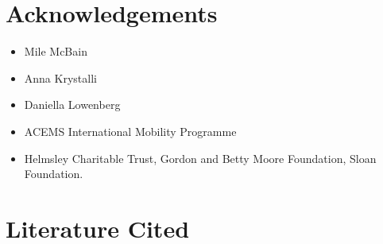 \documentclass[
]{article}
\providecommand{\tightlist}{%
  \setlength{\itemsep}{0pt}\setlength{\parskip}{0pt}}
\begin{document}
\hypertarget{acknowledgements}{%
\section{Acknowledgements}\label{acknowledgements}}

\begin{itemize}
\tightlist
\item
  Mile McBain
\item
  Anna Krystalli
\item
  Daniella Lowenberg
\item
  ACEMS International Mobility Programme
\item
  Helmsley Charitable Trust, Gordon and Betty Moore Foundation, Sloan Foundation.
\end{itemize}

\hypertarget{literature-cited}{%
\section*{Literature Cited}\label{literature-cited}}
\end{document}
